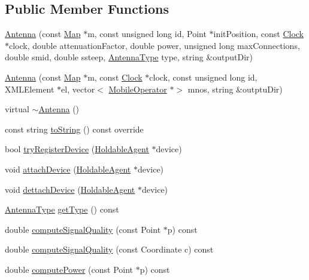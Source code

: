 \subsection*{Public Member Functions}
\begin{DoxyCompactItemize}
\item 
\hyperlink{class_antenna_a45fd110296e26b4cc646a7dc37de16c8}{Antenna} (const \hyperlink{class_map}{Map} $\ast$m, const unsigned long id, Point $\ast$init\+Position, const \hyperlink{class_clock}{Clock} $\ast$clock, double attenuation\+Factor, double power, unsigned long max\+Connections, double smid, double ssteep, \hyperlink{_antenna_type_8h_a7b678b5cb9dedc607131200119d96b16}{Antenna\+Type} type, string \&output\+Dir)
\item 
\hyperlink{class_antenna_abf9c0851c0c51d4c3bbc28a19f85e89c}{Antenna} (const \hyperlink{class_map}{Map} $\ast$m, const \hyperlink{class_clock}{Clock} $\ast$clock, const unsigned long id, X\+M\+L\+Element $\ast$el, vector$<$ \hyperlink{class_mobile_operator}{Mobile\+Operator} $\ast$$>$ mnos, string \&outptu\+Dir)
\item 
virtual \hyperlink{class_antenna_ad7b98073b970db5d6bc83c5c5961fe44}{$\sim$\+Antenna} ()
\item 
const string \hyperlink{class_antenna_a7fea30e065f49a3cbcee02f60bd033c8}{to\+String} () const override
\item 
bool \hyperlink{class_antenna_a4455f5c804e1ea520dd849dc9fd7b0b4}{try\+Register\+Device} (\hyperlink{class_holdable_agent}{Holdable\+Agent} $\ast$device)
\item 
void \hyperlink{class_antenna_a9c804d991a545157feb066761b6a69ef}{attach\+Device} (\hyperlink{class_holdable_agent}{Holdable\+Agent} $\ast$device)
\item 
void \hyperlink{class_antenna_a983a0784315567c2ab6ac1820cf558c5}{dettach\+Device} (\hyperlink{class_holdable_agent}{Holdable\+Agent} $\ast$device)
\item 
\hyperlink{_antenna_type_8h_a7b678b5cb9dedc607131200119d96b16}{Antenna\+Type} \hyperlink{class_antenna_adf45a8b339956741bf8dcb5361f5f249}{get\+Type} () const
\item 
double \hyperlink{class_antenna_afb03d417efec2423a1b67df16d6ebcb6}{compute\+Signal\+Quality} (const Point $\ast$p) const
\item 
double \hyperlink{class_antenna_ae49556bd6046b34a1dc1925d594783a2}{compute\+Signal\+Quality} (const Coordinate c) const
\item 
double \hyperlink{class_antenna_a7caa8004be14f97db64fdf7ae46d6c97}{compute\+Power} (const Point $\ast$p) const
$$
\end{DoxyCompactItemize}
